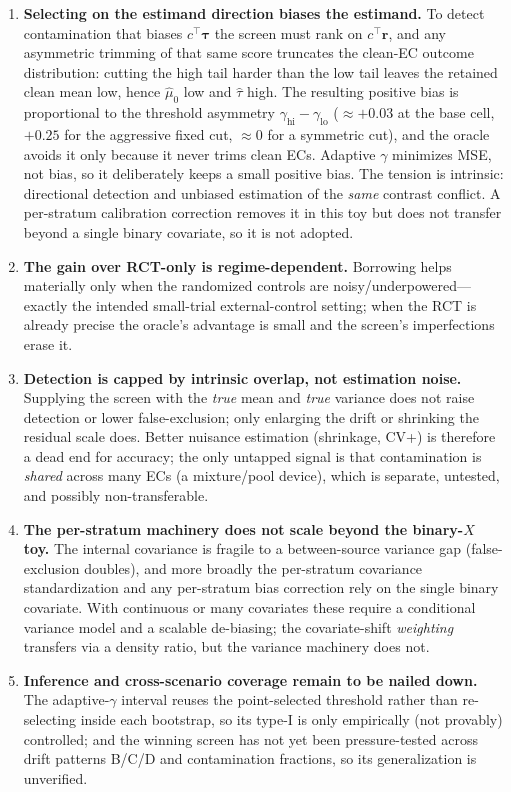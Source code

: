 \documentclass[11pt]{article}
\begin{document}
\begin{enumerate}
    \item \textbf{Selecting on the estimand direction biases the estimand.} To detect contamination that biases $c^{\top}\bm\tau$ the screen must rank on $c^{\top}\bm r$, and any asymmetric trimming of that same score truncates the clean-EC outcome distribution: cutting the high tail harder than the low tail leaves the retained clean mean low, hence $\widehat\mu_0$ low and $\widehat\tau$ high. The resulting positive bias is proportional to the threshold asymmetry $\gamma_{\mathrm{hi}}-\gamma_{\mathrm{lo}}$ ($\approx{+}0.03$ at the base cell, ${+}0.25$ for the aggressive fixed cut, $\approx0$ for a symmetric cut), and the oracle avoids it only because it never trims clean ECs. Adaptive $\gamma$ minimizes MSE, not bias, so it deliberately keeps a small positive bias. The tension is intrinsic: directional detection and unbiased estimation of the \emph{same} contrast conflict. A per-stratum calibration correction removes it in this toy but does not transfer beyond a single binary covariate, so it is not adopted.
    \item \textbf{The gain over RCT-only is regime-dependent.} Borrowing helps materially only when the randomized controls are noisy/underpowered---exactly the intended small-trial external-control setting; when the RCT is already precise the oracle's advantage is small and the screen's imperfections erase it.
    \item \textbf{Detection is capped by intrinsic overlap, not estimation noise.} Supplying the screen with the \emph{true} mean and \emph{true} variance does not raise detection or lower false-exclusion; only enlarging the drift or shrinking the residual scale does. Better nuisance estimation (shrinkage, CV+) is therefore a dead end for accuracy; the only untapped signal is that contamination is \emph{shared} across many ECs (a mixture/pool device), which is separate, untested, and possibly non-transferable.
    \item \textbf{The per-stratum machinery does not scale beyond the binary-$X$ toy.} The internal covariance is fragile to a between-source variance gap (false-exclusion doubles), and more broadly the per-stratum covariance standardization and any per-stratum bias correction rely on the single binary covariate. With continuous or many covariates these require a conditional variance model and a scalable de-biasing; the covariate-shift \emph{weighting} transfers via a density ratio, but the variance machinery does not.
    \item \textbf{Inference and cross-scenario coverage remain to be nailed down.} The adaptive-$\gamma$ interval reuses the point-selected threshold rather than re-selecting inside each bootstrap, so its type-I is only empirically (not provably) controlled; and the winning screen has not yet been pressure-tested across drift patterns B/C/D and contamination fractions, so its generalization is unverified.
\end{enumerate}
\end{document}
